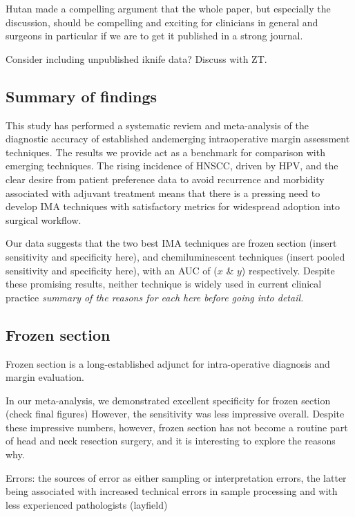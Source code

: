 Hutan made a compelling argument that the whole paper, but especially the discussion, should be compelling and exciting for clinicians in general and surgeons in particular if we are to get it published in a strong journal.

Consider including unpublished iknife data? Discuss with ZT.

\subsection{Summary of findings}

This study has performed a systematic reviem and meta-analysis of the diagnostic accuracy of established andemerging intraoperative margin assessment techniques.
The results we provide act as a benchmark for comparison with emerging techniques.
The rising incidence of HNSCC, driven by HPV, and the clear desire from patient preference data to avoid recurrence and morbidity associated with adjuvant treatment means that there is a pressing need to develop IMA techniques with satisfactory metrics for widespread adoption into surgical workflow.

Our data suggests that the two best IMA techniques are frozen section (insert sensitivity and specificity here), and chemiluminescent techniques (insert pooled sensitivity and specificity here), with an AUC of ($x$ \& $y$) respectively.
Despite these promising results, neither technique is widely used in current clinical practice
\emph{summary of the reasons for each here before going into detail.}

\subsection{Frozen section}

Frozen section is a long-established adjunct for intra-operative diagnosis and margin evaluation.

In our meta-analysis, we demonstrated excellent specificity for frozen section (check final figures)
However, the sensitivity was less impressive overall.
Despite these impressive numbers, however, frozen section has not become a routine part of head and neck resection surgery, and it is interesting to explore the reasons why.

Errors: the sources of error as either sampling or interpretation errors, the latter being associated with increased technical errors in sample processing and with less experienced pathologists (layfield)

